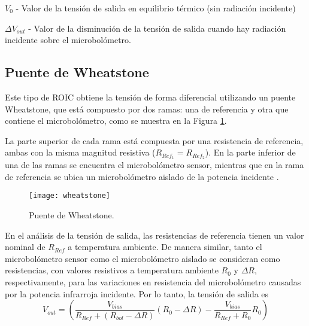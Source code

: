 $V_{0}$ - Valor de la tensión de salida en equilibrio térmico (sin radiación incidente)


$\Delta V_{out}$ - Valor de la disminución de la tensión de salida cuando hay radiación incidente sobre el microbolómetro.

\subsection{Puente de Wheatstone}
Este tipo de ROIC obtiene la tensión de forma diferencial utilizando un puente Wheatstone, que está compuesto por dos ramas: una de referencia y otra que contiene el microbolómetro, como se muestra en la Figura \ref{fig:wheatstone}.

La parte superior de cada rama está compuesta por una resistencia de referencia, ambas con la misma magnitud resistiva ($R_{Ref_1} = R_{Ref_2}$). En la parte inferior de una de las ramas se encuentra el microbolómetro sensor, mientras que en la rama de referencia se ubica un microbolómetro aislado de la potencia incidente \cite{BlancoMDA}.
            \begin{figure}[hbtp]
                \centering
                \texttt{[image: wheatstone]}
                \caption{Puente de Wheatstone.}
                \label{fig:wheatstone}
            \end{figure}

En el análisis de la tensión de salida, las resistencias de referencia tienen un valor nominal de $R_{Ref}$ a temperatura ambiente. De manera similar, tanto el microbolómetro sensor como el microbolómetro aislado se consideran como resistencias, con valores resistivos a temperatura ambiente $R_{0}$ y $\Delta R$, respectivamente, para las variaciones en resistencia del microbolómetro causadas por la potencia infrarroja incidente. Por lo tanto, la tensión de salida es \cite{BlancoMDA}
        \begin{equation}
        V_{out} =\left(\frac{V_{bias}}{R_{Ref} + (R_{bol} - \Delta R)}(R_{0} - \Delta R)- \frac{V_{bias}}{R_{Ref}+ R_{0}}R_{0} \right)
        \label{eq:Puente}
        \end{equation} 


